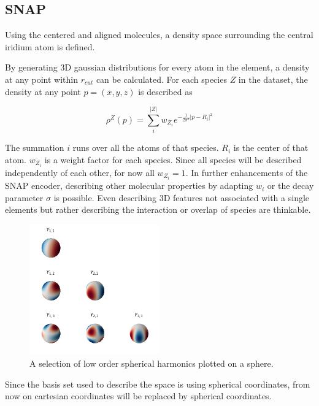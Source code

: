 \subsection{SNAP}

Using the centered and aligned molecules, a density space surrounding the central iridium atom is defined.

By generating 3D gaussian distributions for every atom in the element, a density at any point within $r_{cut}$ can be calculated.
For each species $Z$ in the dataset, the density at any point $p = (x,y,z)$ is described as

$$\rho^Z(p) = \sum_i^{|Z|} w_{Z_i} e^{- \frac{1}{2\sigma^2} \vert p - R_i \vert^2 }$$  %

The summation $i$ runs over all the atoms of that species.
$R_i$ is the center of that atom.
$w_{Z_i}$ is a weight factor for each species. 
Since all species will be described independently of each other, for now all $w_{Z_i}=1$.
In further enhancements of the SNAP encoder, describing other molecular properties by adapting $w_{i}$ or the decay parameter $\sigma$ is possible.
Even describing 3D features not associated with a single elements but rather describing the interaction or overlap of species are thinkable.

\begin{figure} [H]
  \centering
  \includegraphics[width=0.5\textwidth]{figures/snap/sph-harm.png} %
  \caption[Spherical harmonics]{A selection of low order spherical harmonics plotted on a sphere. } %
  \label{fig:sphharm}
\end{figure}

Since the basis set used to describe the space is using spherical coordinates, from now on
cartesian coordinates will be replaced by spherical coordinates.

